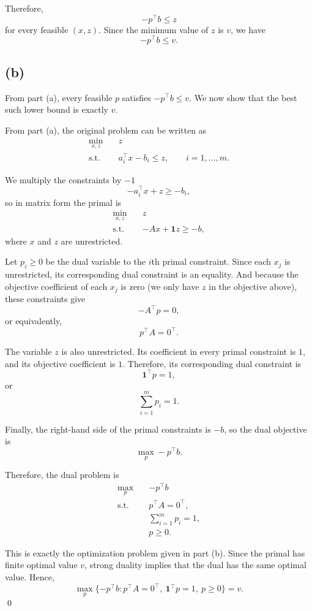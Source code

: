 \documentclass{article}
\begin{document}
Therefore,
\[
-p^\top b\leq z
\]
for every feasible $(x,z)$. Since the minimum value of $z$ is $v$, we
have
\[
-p^\top b\leq v.
\]




\vspace{5mm}
\subsection*{(b)}


From part (a), every feasible $p$ satisfies
$
-p^\top b \leq v.
$
We now show that the best such lower bound is exactly $v$.

From part (a), the original problem can be written as
\[
\begin{aligned}
\min_{x,z}\quad & z\\
\text{s.t.}\quad & a_i^\top x-b_i\leq z,
\qquad i=1,\ldots,m.
\end{aligned}
\]

We multiply the constraints by $-1$\[
-a_i^\top x+z\geq -b_i,
\]
so in matrix form the primal is
\[
\begin{aligned}
\min_{x,z}\quad & z\\
\text{s.t.}\quad & -Ax+\mathbf{1}z\geq -b,
\end{aligned}
\]
where $x$ and $z$ are unrestricted.

Let $p_i\geq 0$ be the dual variable to the $i$th
primal constraint. Since each $x_j$ is unrestricted, its corresponding
dual constraint is an equality. And because the objective coefficient of
each $x_j$ is zero (we only have $z$ in the objective above), these constraints give
\[
-A^\top p=0,
\]
or equivalently,
\[
p^\top A=0^\top.
\]

The variable $z$ is also unrestricted. Its coefficient in every primal
constraint is $1$, and its objective coefficient is $1$. Therefore, its
corresponding dual constraint is
\[
\mathbf{1}^\top p=1,
\]
or
\[
\sum_{i=1}^m p_i=1.
\]

Finally, the right-hand side of the primal constraints is $-b$, so the
dual objective is
\[
\max_p -p^\top b.
\]

Therefore, the dual problem is
\[
\begin{aligned}
\max_p\quad & -p^\top b\\
\text{s.t.}\quad & p^\top A=0^\top,\\
& \sum_{i=1}^m p_i=1,\\
& p\geq 0.
\end{aligned}
\]

This is exactly the optimization problem given in part (b). Since the
primal has finite optimal value $v$, strong duality implies that the
dual has the same optimal value. Hence,
\[
\max_p\{-p^\top b:
p^\top A=0^\top,\ \mathbf{1}^\top p=1,\ p\geq0\}=v.
\]
\qed
\end{document}
